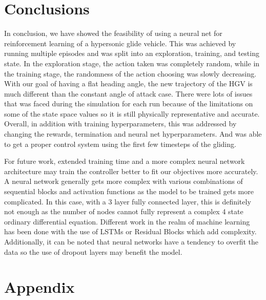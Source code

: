 \documentclass[11pt]{article} %
\begin{document}
\section{Conclusions}
In conclusion, we have showed the feasibility of using a neural net for reinforcement 
learning of a hypersonic glide vehicle. This was achieved by running multiple episodes and was split into an exploration, 
training, and testing state. In the exploration stage, the action taken was completely random, while in the training stage, 
the randomness of the action choosing was slowly decreasing. With our goal of having a flat heading angle, the new trajectory 
of the HGV is much different than the constant angle of attack case. There were lots of issues that was faced during the 
simulation for each run because of the limitations on some of the state space values so it is still physically representative 
and accurate. Overall, in addition with training hyperparameters, this was addressed by changing the rewards, termination 
and neural net hyperparameters. And was able to get a proper control system using the first few timesteps of the gliding. 

For future work, extended training time and a more complex neural network architecture may train the controller better 
to fit our objectives more accurately. A neural network generally gets more complex with various combinations of sequential 
blocks and activation functions as the model to be trained gets more complicated. In this case, with a 3 layer fully connected layer, 
this is definitely not enough as the number of nodes cannot fully represent a complex 4 state ordinary differential equation. Different work
in the realm of machine learning has been done with the use of LSTMs or Residual Blocks which add complexity. Additionally, it can be noted that
neural networks have a tendency to overfit the data so the use of dropout layers may benefit the model.

\newpage
\section*{Appendix}
\end{document}
